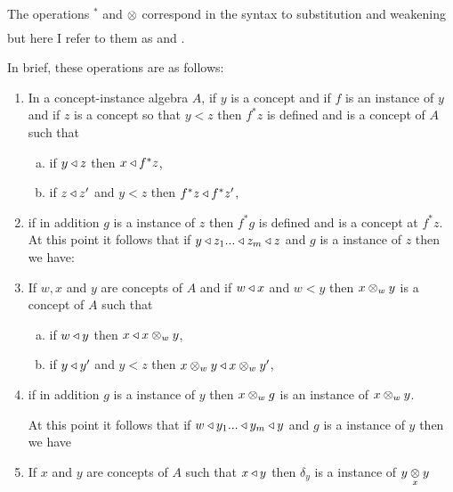 \documentclass[10pt,a4paper]{article}
\begin{document}
\vspace{1cm}
The  operations $^*$ and $\crossx{}{}{}$  
 correspond in the syntax to  substitution and  weakening but here I refer to them as  and 
 .

In brief, these operations are as follows:

\begin{enumerate}
\item In a concept-instance algebra $A$, if $y$ is a concept and if $f$ is an instance of $y$
 and if $z$ is a concept so that $y < z$ then $f^*z$ is defined and is a concept of $A$ 
      such that 
			\begin{enumerate}[(a)]
			\item if $y \base z$ then $x \base f^*z$,
			\item if $z \base z'$ and $y <z$ then $f^*z \base f^*z'$,
			\end{enumerate} 


\item if in addition $g$ is a instance of $z$ then $f^*g$ is defined and is a concept at $f^*z$. \\



At this point it follows that if $y \base z_1 ... \base z_m \base z$ and $g$ is a instance of $z$ then we have:

 

\item If $w,x$ and $y$ are concepts of $A$  and if $w \base x$ and $w < y$ then $x \cross_w y$ is a concept of $A$ 
such that
    \begin{enumerate}[(a)]
		\item if $w \base y$ then $x \base x \cross_w y$,
		\item if $y \base y'$ and $y <z$ then $x \cross_w y \base x \cross_w y'$,
		\end{enumerate}
\item if in addition $g$ is a instance of $y$ then $x \cross_w g$ is an instance of $x \cross_w y$.

At this point it follows that if $w \base y_1 ... \base y_m \base y$ and $g$ is a instance of $y$ then we have

\vspace{0.5cm}
\item If $x$ and $y$ are concepts of $A$ such that $x \base y$ then $\delta_y$ is a instance of $\crossx{y}{y}{x}$
\vspace{0.5cm}
 
\end{enumerate}
\end{document}
